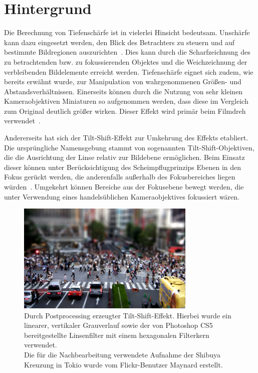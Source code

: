 \documentclass{acmsiggraph}                     %
\begin{document}
\section{Hintergrund}

Die Berechnung von Tiefenschärfe ist in vielerlei Hinsicht bedeutsam. Unschärfe kann dazu eingesetzt werden, den Blick des Betrachters zu steuern und auf bestimmte Bildregionen auszurichten~\cite{Held:2010cr}. Dies kann durch die Scharfzeichnung des zu betrachtenden bzw. zu fokussierenden Objektes und die Weichzeichnung der verbleibenden Bildelemente erreicht werden. Tiefenschärfe eignet sich zudem, wie bereits erwähnt wurde, zur Manipulation von wahrgenommenen Größen- und Abstandsverhältnissen. Einerseits können durch die Nutzung von sehr kleinen Kameraobjektiven Miniaturen so aufgenommen werden, dass diese im Vergleich zum Original deutlich größer wirken. Dieser Effekt wird primär beim Filmdreh verwendet~\cite{Held:2010cr}.

Andererseits hat sich der Tilt-Shift-Effekt zur Umkehrung des Effekts etabliert. Die ursprüngliche Namensgebung stammt von sogenannten Tilt-Shift-Objektiven, die die Ausrichtung der Linse relativ zur Bildebene ermöglichen. Beim Einsatz dieser können unter Berücksichtigung des Scheimpflugprinzips Ebenen in den Fokus gerückt werden, die anderenfalls außerhalb des Fokusbereiches liegen würden~\cite{Held:2010cr}. Umgekehrt können Bereiche aus der Fokusebene bewegt werden, die unter Verwendung eines handelsüblichen Kameraobjektives fokussiert wären.

\begin{figure}[htbp]
\centering
\includegraphics[width=3.35in]{Tilt-Shift-1}
\caption{Durch Postprocessing erzeugter Tilt-Shift-Effekt. Hierbei wurde ein linearer, vertikaler Grauverlauf sowie der von Photoshop CS5 bereitgestellte Linsenfilter mit einem hexagonalen Filterkern verwendet. \\ \small{Die für die Nachbearbeitung verwendete Aufnahme der Shibuya Kreuzung in Tokio wurde vom Flickr-Benutzer Maynard erstellt.}}
\label{flickr}
\end{figure}
\end{document}
